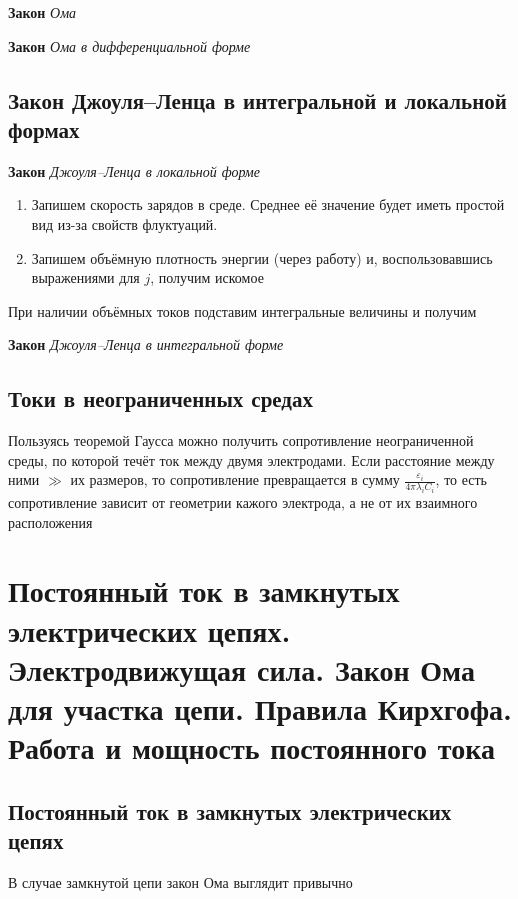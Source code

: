 \documentclass[a4paper, 14pt]{article}
\begin{document}
    \textbf{Закон} \textit{Ома}
    
    \textbf{Закон} \textit{Ома в дифференциальной форме}
    
    \subsection{Закон Джоуля–Ленца в интегральной и локальной формах}
    
    \textbf{Закон} \textit{Джоуля–Ленца в локальной форме}
    
    \begin{enumerate}
        \item Запишем скорость зарядов в среде.
        Среднее её значение будет иметь простой вид из-за свойств флуктуаций.
        \item Запишем объёмную плотность энергии (через работу) и, воспользовавшись выражениями для $j$, получим искомое
    \end{enumerate}
    
    При наличии объёмных токов подставим интегральные величины и получим
    
    \textbf{Закон} \textit{Джоуля–Ленца в интегральной форме}
    
    \subsection{Токи в неограниченных средах}
    
    Пользуясь теоремой Гаусса можно получить сопротивление неограниченной среды, по которой течёт ток между двумя
    электродами.
    Если расстояние между ними $\gg$ их размеров, то сопротивление превращается в сумму $\frac{\varepsilon_i}{4
    \pi \lambda_i C_i}$, то есть сопротивление зависит от геометрии кажого электрода, а не от их взаимного расположения
    
    \section{Постоянный ток в замкнутых электрических цепях.
    Электродвижущая сила.
    Закон Ома для участка цепи.
    Правила Кирхгофа.
    Работа и мощность постоянного тока}
    
    \subsection{Постоянный ток в замкнутых электрических цепях}
    
    В случае замкнутой цепи закон Ома выглядит привычно
    
\end{document}
